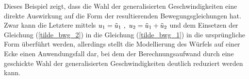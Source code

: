 Dieses Beispiel zeigt, dass die Wahl der generalisierten Geschwindigkeiten eine direkte Auswirkung auf die Form der resultierenden Bewegungsgleichungen hat. Zwar kann die Letztere mittels $u_{\text{1}} = \tilde{u}_{\text{1}} \ ,\ u_{\text{2}} = \tilde{u}_{\text{1}} + \tilde{u}_{\text{2}}$ und dem Einsetzen der Gleichung (\ref{tilde_bwg_2}) in die Gleichung (\ref{tilde_bwg_1}) in die ursprüngliche Form überführt werden, allerdings stellt die Modellierung des Würfels auf einer Ecke einen Anwendungsfall dar, bei dem der Berechnungsaufwand durch eine geschickte Wahl der generalisierten Geschwindigkeiten deutlich reduziert werden kann.